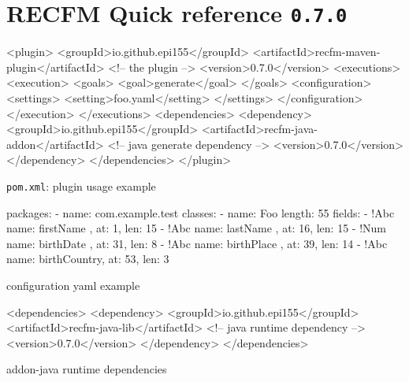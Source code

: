 \documentclass[a4paper,10pt]{article}
\newenvironment{elisting}[1][H]
  {\captionsetup{aboveskip=0pt}\begin{listing}[#1]}
  {\end{listing}%
}
\begin{document}
\section*{RECFM Quick reference \quad \texttt{0.7.0}}

\begin{elisting}%
\begin{xmlcode}
<plugin>
    <groupId>io.github.epi155</groupId>
    <artifactId>recfm-maven-plugin</artifactId>  <!-- the plugin -->
    <version>0.7.0</version>
    <executions>
        <execution>
            <goals>
                <goal>generate</goal>
            </goals>
            <configuration>
                <settings>
                    <setting>foo.yaml</setting>
                </settings>
            </configuration>
        </execution>
    </executions>
    <dependencies>
        <dependency>
            <groupId>io.github.epi155</groupId>
            <artifactId>recfm-java-addon</artifactId>  <!-- java generate dependency -->
            <version>0.7.0</version>
        </dependency>
    </dependencies>
</plugin>
\end{xmlcode}
\caption{\texttt{pom.xml}: plugin usage example}
\end{elisting}

\vspace*{-20pt}

\begin{elisting}%
\begin{yamlcode}
packages:
  - name: com.example.test
    classes:
      - name: Foo
        length: 55
        fields:
          - !Abc { name: firstName   , at:  1, len: 15 }
          - !Abc { name: lastName    , at: 16, len: 15 }
          - !Num { name: birthDate   , at: 31, len:  8 }
          - !Abc { name: birthPlace  , at: 39, len: 14 }
          - !Abc { name: birthCountry, at: 53, len:  3 }
\end{yamlcode}
\caption{configuration yaml example}
\end{elisting}

\vspace*{-20pt}

\begin{elisting}%
\begin{xmlcode}
<dependencies>
  <dependency>
    <groupId>io.github.epi155</groupId>
    <artifactId>recfm-java-lib</artifactId>  <!-- java runtime dependency -->
    <version>0.7.0</version>
  </dependency>
</dependencies>
\end{xmlcode}
\caption{addon-java runtime dependencies}
\end{elisting}
\end{document}
